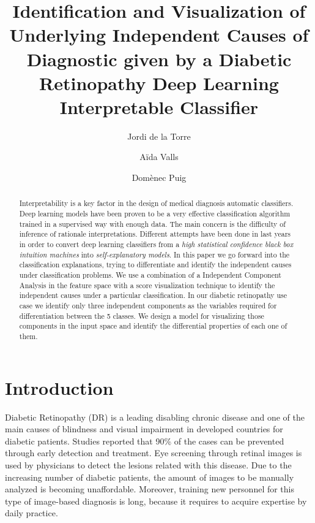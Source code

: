 \documentclass{llncs}
\begin{document}
\title{Identification and Visualization of Underlying Independent Causes of Diagnostic given by a Diabetic Retinopathy Deep Learning Interpretable Classifier}
\author{Jordi de la Torre \and A\"ida Valls \and Dom\`enec Puig}
\maketitle
%
		
\begin{abstract}
Interpretability is a key factor in the design of medical diagnosis automatic classifiers. Deep learning models have been proven to be a very effective classification algorithm trained in a supervised way with enough data. The main concern is the difficulty of inference of rationale interpretations. Different attempts have been done in last years in order to convert deep learning classifiers from a \emph{high statistical confidence black box intuition machines} into \emph{self-explanatory models}. In this paper we go forward into the classification explanations, trying to differentiate and identify the independent causes under classification problems. We use a combination of a Independent Component Analysis in the feature space with a score visualization technique to identify the independent causes under a particular classification. In our diabetic retinopathy use case we identify only three independent components as the variables required for differentiation between the 5 classes. We design a model for visualizing those components in the input space and identify the differential properties of each one of them.
\end{abstract}
	

\section{Introduction}

Diabetic Retinopathy (DR) is a leading disabling chronic disease  and  one of the main causes of blindness and visual impairment in developed countries for diabetic patients. Studies reported that 90\% of the cases can be prevented through early detection and treatment. Eye screening through retinal images is used by physicians to detect the lesions related with this disease. Due to the increasing number of diabetic patients, the amount of images to be manually analyzed is becoming unaffordable. Moreover, training new personnel for this type of image-based diagnosis is long, because it requires to acquire expertise by daily practice. 
\end{document}
